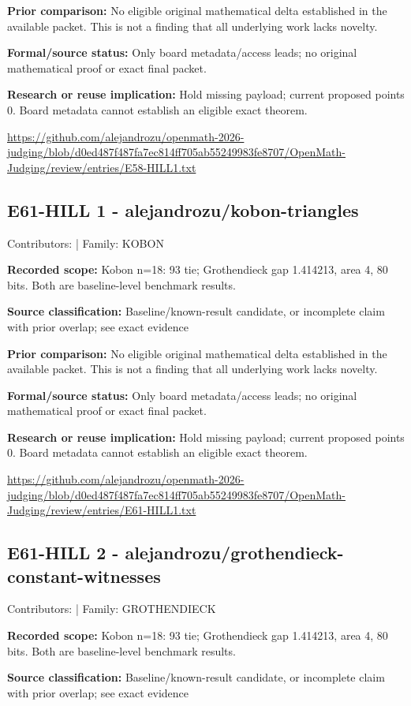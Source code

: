 \documentclass[11pt,a4paper]{article}
\begin{document}
\textbf{Prior comparison:} No eligible original mathematical delta established in the available packet. This is not a finding that all underlying work lacks novelty.

\textbf{Formal/source status:} Only board metadata/access leads; no original mathematical proof or exact final packet. 

\textbf{Research or reuse implication:} Hold missing payload; current proposed points 0. Board metadata cannot establish an eligible exact theorem.

{\small \url{https://github.com/alejandrozu/openmath-2026-judging/blob/d0ed487f487fa7ec814ff705ab55249983fe8707/OpenMath-Judging/review/entries/E58-HILL1.txt}\par}

\begin{samepage}
\subsection{E61-HILL 1  -  alejandrozu/kobon-triangles}
{\small Contributors:  | Family: KOBON\par}

\textbf{Recorded scope:} Kobon n=18: 93 tie; Grothendieck gap 1.414213, area 4, 80 bits. Both are baseline-level benchmark results.

\end{samepage}
\textbf{Source classification:} Baseline/known-result candidate, or incomplete claim with prior overlap; see exact evidence

\textbf{Prior comparison:} No eligible original mathematical delta established in the available packet. This is not a finding that all underlying work lacks novelty.

\textbf{Formal/source status:} Only board metadata/access leads; no original mathematical proof or exact final packet. 

\textbf{Research or reuse implication:} Hold missing payload; current proposed points 0. Board metadata cannot establish an eligible exact theorem.

{\small \url{https://github.com/alejandrozu/openmath-2026-judging/blob/d0ed487f487fa7ec814ff705ab55249983fe8707/OpenMath-Judging/review/entries/E61-HILL1.txt}\par}

\begin{samepage}
\subsection{E61-HILL 2  -  alejandrozu/grothendieck-constant-witnesses}
{\small Contributors:  | Family: GROTHENDIECK\par}

\textbf{Recorded scope:} Kobon n=18: 93 tie; Grothendieck gap 1.414213, area 4, 80 bits. Both are baseline-level benchmark results.

\end{samepage}
\textbf{Source classification:} Baseline/known-result candidate, or incomplete claim with prior overlap; see exact evidence
\end{document}
